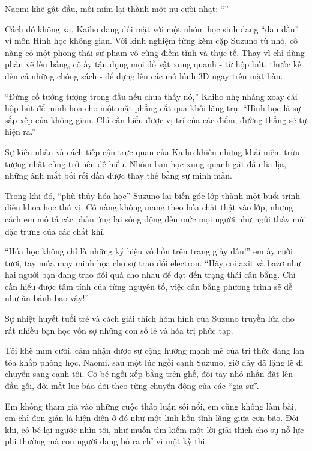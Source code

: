 \documentclass[../main.tex]{subfiles}
\begin{document}
Naomi khẽ gật đầu, môi mím lại thành một nụ cười nhạt: ``''

\ct

Cách đó không xa, Kaiho đang đối mặt với một nhóm học sinh đang ``đau đầu'' vì môn Hình học không gian. Với kinh nghiệm từng kèm cặp Suzuno từ nhỏ, cô nàng có một phong thái sư phạm vô cùng điềm tĩnh và thực tế. Thay vì chỉ dùng phấn vẽ lên bảng, cô ấy tận dụng mọi đồ vật xung quanh - từ hộp bút, thước kẻ đến cả những chồng sách - để dựng lên các mô hình 3D ngay trên mặt bàn.

``Đừng cố tưởng tượng trong đầu nếu chưa thấy nó,'' Kaiho nhẹ nhàng xoay cái hộp bút để minh họa cho một mặt phẳng cắt qua khối lăng trụ. ``Hình học là sự sắp xếp của không gian. Chỉ cần hiểu được vị trí của các điểm, đường thẳng sẽ tự hiện ra.''

Sự kiên nhẫn và cách tiếp cận trực quan của Kaiho khiến những khái niệm trừu tượng nhất cũng trở nên dễ hiểu. Nhóm bạn học xung quanh gật đầu lia lịa, những ánh mắt bối rối dần được thay thế bằng sự minh mẫn.

Trong khi đó, ``phù thủy hóa học'' Suzuno lại biến góc lớp thành một buổi trình diễn khoa học thú vị. Cô nàng không mang theo hóa chất thật vào lớp, nhưng cách em mô tả các phản ứng lại sống động đến mức mọi người như ngửi thấy mùi đặc trưng của các chất khí.

``Hóa học không chỉ là những ký hiệu vô hồn trên trang giấy đâu!'' em ấy cười tươi, tay múa may minh họa cho sự trao đổi electron. ``Hãy coi axit và bazơ như hai người bạn đang trao đổi quà cho nhau để đạt đến trạng thái cân bằng. Chỉ cần hiểu được tâm tính của từng nguyên tố, việc cân bằng phương trình sẽ dễ như ăn bánh bao vậy!''

Sự nhiệt huyết tuổi trẻ và cách giải thích hóm hỉnh của Suzuno truyền lửa cho rất nhiều bạn học vốn sợ những con số lẻ và hóa trị phức tạp.

Tôi khẽ mỉm cười, cảm nhận được sự cộng hưởng mạnh mẽ của tri thức đang lan tỏa khắp phòng học. Naomi, sau một lúc ngồi cạnh Suzuno, giờ đây đã lặng lẽ di chuyển sang cạnh tôi. Cô bé ngồi xếp bằng trên ghế, đôi tay nhỏ nhắn đặt lên đầu gối, đôi mắt lục bảo dõi theo từng chuyển động của các ``gia sư''.

Em không tham gia vào những cuộc thảo luận sôi nổi, em cũng không làm bài, em chỉ đơn giản là hiện diện ở đó như một linh hồn tĩnh lặng giữa cơn bão. Đôi khi, cô bé lại ngước nhìn tôi, như muốn tìm kiếm một lời giải thích cho sự nỗ lực phi thường mà con người đang bỏ ra chỉ vì một kỳ thi.
\end{document}
